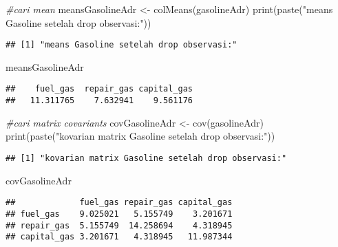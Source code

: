\documentclass[
]{article}
\newenvironment{Shaded}{\begin{snugshade}}{\end{snugshade}}
\newcommand{\CommentTok}[1]{\textcolor[rgb]{0.56,0.35,0.01}{\textit{#1}}}
\newcommand{\FunctionTok}[1]{\textcolor[rgb]{0.00,0.00,0.00}{#1}}
\newcommand{\NormalTok}[1]{#1}
\newcommand{\OtherTok}[1]{\textcolor[rgb]{0.56,0.35,0.01}{#1}}
\newcommand{\StringTok}[1]{\textcolor[rgb]{0.31,0.60,0.02}{#1}}
\begin{document}
\begin{Shaded}
\begin{Highlighting}[]
\CommentTok{\#cari mean}
\NormalTok{meansGasolineAdr }\OtherTok{\textless{}{-}} \FunctionTok{colMeans}\NormalTok{(gasolineAdr)}
\FunctionTok{print}\NormalTok{(}\FunctionTok{paste}\NormalTok{(}\StringTok{"means Gasoline setelah drop observasi:"}\NormalTok{))}
\end{Highlighting}
\end{Shaded}

\begin{verbatim}
## [1] "means Gasoline setelah drop observasi:"
\end{verbatim}

\begin{Shaded}
\begin{Highlighting}[]
\NormalTok{meansGasolineAdr}
\end{Highlighting}
\end{Shaded}

\begin{verbatim}
##    fuel_gas  repair_gas capital_gas 
##   11.311765    7.632941    9.561176
\end{verbatim}

\begin{Shaded}
\begin{Highlighting}[]
\CommentTok{\#cari matrix covariants}
\NormalTok{covGasolineAdr }\OtherTok{\textless{}{-}} \FunctionTok{cov}\NormalTok{(gasolineAdr)}
\FunctionTok{print}\NormalTok{(}\FunctionTok{paste}\NormalTok{(}\StringTok{"kovarian matrix Gasoline setelah drop observasi:"}\NormalTok{))}
\end{Highlighting}
\end{Shaded}

\begin{verbatim}
## [1] "kovarian matrix Gasoline setelah drop observasi:"
\end{verbatim}

\begin{Shaded}
\begin{Highlighting}[]
\NormalTok{covGasolineAdr}
\end{Highlighting}
\end{Shaded}

\begin{verbatim}
##             fuel_gas repair_gas capital_gas
## fuel_gas    9.025021   5.155749    3.201671
## repair_gas  5.155749  14.258694    4.318945
## capital_gas 3.201671   4.318945   11.987344
\end{verbatim}
\end{document}
